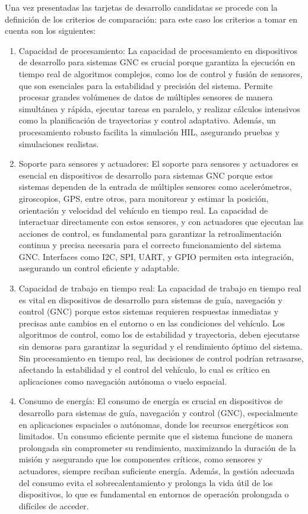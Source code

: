 Una vez presentadas las tarjetas de desarrollo candidatas se procede con la definición de los criterios de comparación: para este caso los criterios a tomar en cuenta son los siguientes:

\begin{enumerate}
    \item Capacidad de procesamiento: La capacidad de procesamiento en dispositivos de desarrollo para sistemas GNC es crucial porque garantiza la ejecución en tiempo real de algoritmos complejos, como los de control y fusión de sensores, que son esenciales para la estabilidad y precisión del sistema. Permite procesar grandes volúmenes de datos de múltiples sensores de manera simultánea y rápida, ejecutar tareas en paralelo, y realizar cálculos intensivos como la planificación de trayectorias y control adaptativo. Además, un procesamiento robusto facilita la simulación HIL, asegurando pruebas y simulaciones realistas.

    \item Soporte para sensores y actuadores: El soporte para sensores y actuadores es esencial en dispositivos de desarrollo para sistemas GNC porque estos sistemas dependen de la entrada de múltiples sensores como acelerómetros, giroscopios, GPS, entre otros, para monitorear y estimar la posición, orientación y velocidad del vehículo en tiempo real. La capacidad de interactuar directamente con estos sensores, y con actuadores que ejecutan las acciones de control, es fundamental para garantizar la retroalimentación continua y precisa necesaria para el correcto funcionamiento del sistema GNC. Interfaces como I2C, SPI, UART, y GPIO permiten esta integración, asegurando un control eficiente y adaptable.

    \item Capacidad de trabajo en tiempo real: La capacidad de trabajo en tiempo real es vital en dispositivos de desarrollo para sistemas de guía, navegación y control (GNC) porque estos sistemas requieren respuestas inmediatas y precisas ante cambios en el entorno o en las condiciones del vehículo. Los algoritmos de control, como los de estabilidad y trayectoria, deben ejecutarse sin demoras para garantizar la seguridad y el rendimiento óptimo del sistema. Sin procesamiento en tiempo real, las decisiones de control podrían retrasarse, afectando la estabilidad y el control del vehículo, lo cual es crítico en aplicaciones como navegación autónoma o vuelo espacial.

    \item Consumo de energía: El consumo de energía es crucial en dispositivos de desarrollo para sistemas de guía, navegación y control (GNC), especialmente en aplicaciones espaciales o autónomas, donde los recursos energéticos son limitados. Un consumo eficiente permite que el sistema funcione de manera prolongada sin comprometer su rendimiento, maximizando la duración de la misión y asegurando que los componentes críticos, como sensores y actuadores, siempre reciban suficiente energía. Además, la gestión adecuada del consumo evita el sobrecalentamiento y prolonga la vida útil de los dispositivos, lo que es fundamental en entornos de operación prolongada o difíciles de acceder.


\end{enumerate}
